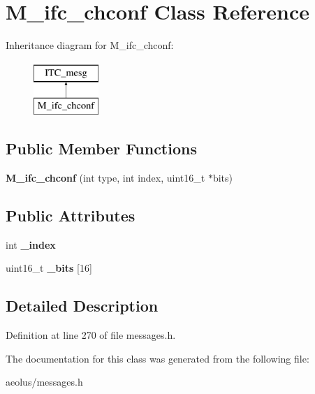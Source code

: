 \hypertarget{class_m__ifc__chconf}{}\section{M\+\_\+ifc\+\_\+chconf Class Reference}
\label{class_m__ifc__chconf}
Inheritance diagram for M\+\_\+ifc\+\_\+chconf\+:\begin{figure}[H]
\begin{center}
\leavevmode
\includegraphics[height=2.000000cm]{class_m__ifc__chconf}
\end{center}
\end{figure}
\subsection*{Public Member Functions}
\begin{DoxyCompactItemize}
\item 
\mbox{\label{class_m__ifc__chconf_a780606db872c8d4d38e4ff47b03633e3}} 
{\bfseries M\+\_\+ifc\+\_\+chconf} (int type, int index, uint16\+\_\+t $\ast$bits)
\end{DoxyCompactItemize}
\subsection*{Public Attributes}
\begin{DoxyCompactItemize}
\item 
\mbox{\label{class_m__ifc__chconf_a671c6135a9623fd33053ce83a9453c0a}} 
int {\bfseries \+\_\+index}
\item 
\mbox{\label{class_m__ifc__chconf_a46f6019208646c07c15c99de8a65256f}} 
uint16\+\_\+t {\bfseries \+\_\+bits} \mbox{[}16\mbox{]}
\end{DoxyCompactItemize}


\subsection{Detailed Description}


Definition at line 270 of file messages.\+h.



The documentation for this class was generated from the following file\+:\begin{DoxyCompactItemize}
\item 
aeolus/messages.\+h\end{DoxyCompactItemize}
